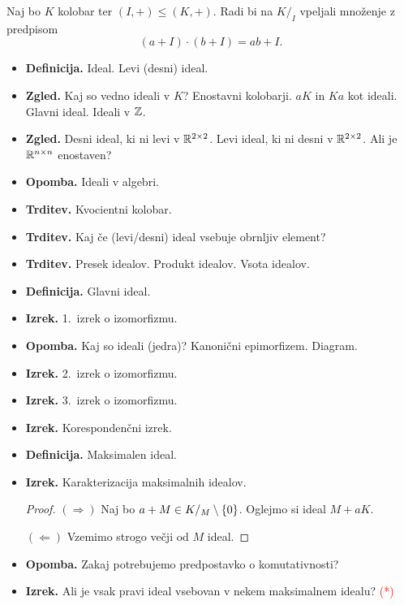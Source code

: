 \begin{enumerate}
    Naj bo \(K\) kolobar ter \((I, +) \leq (K, +)\). Radi bi na \(K/_I\) vpeljali množenje z predpisom
    \[(a + I) \cdot (b + I) = ab + I.\]
    \begin{itemize}
        \item \textbf{Definicija.} Ideal. Levi (desni) ideal.
        \item \textbf{Zgled.} Kaj so vedno ideali v \(K\)? Enostavni kolobarji. \(aK\) in \(Ka\) kot ideali. Glavni ideal. Ideali v \(\mathbb{Z}\).
        \item \textbf{Zgled.} Desni ideal, ki ni levi v \(\mathbb{R}^{2 \times 2}\). Levi ideal, ki ni desni v \(\mathbb{R}^{2 \times 2}\). Ali je \(\mathbb{R}^{n \times n}\) enostaven?
        \item \textbf{Opomba.} Ideali v algebri.
        \item \textbf{Trditev.} Kvocientni kolobar.
        \item \textbf{Trditev.} Kaj če (levi/desni) ideal vsebuje obrnljiv element?
        \item \textbf{Trditev.} Presek idealov. Produkt idealov. Vsota idealov.
        \item \textbf{Definicija.} Glavni ideal.
        \item \textbf{Izrek.} 1.\ izrek o izomorfizmu. \todo{*}
        \item \textbf{Opomba.} Kaj so ideali (jedra)? Kanonični epimorfizem. Diagram.
        \item \textbf{Izrek.} 2.\ izrek o izomorfizmu.
        \item \textbf{Izrek.} 3.\ izrek o izomorfizmu.
        \item \textbf{Izrek.} Korespondenčni izrek.
        \item \textbf{Definicija.} Maksimalen ideal.
        \item \textbf{Izrek.} Karakterizacija maksimalnih idealov. \todo{*}
        \begin{proof}
            \((\Rightarrow)\) Naj bo \(a + M \in K/_M \setminus \{0\}\). Oglejmo si ideal \(M + aK\).

            \((\Leftarrow)\) Vzemimo strogo večji od \(M\) ideal.
        \end{proof}
        \item \textbf{Opomba.} Zakaj potrebujemo predpostavko o komutativnosti?
        \item \textbf{Izrek.} Ali je vsak pravi ideal vsebovan v nekem maksimalnem idealu? \textcolor{red}{(*)}
    \end{itemize}
\end{enumerate}

